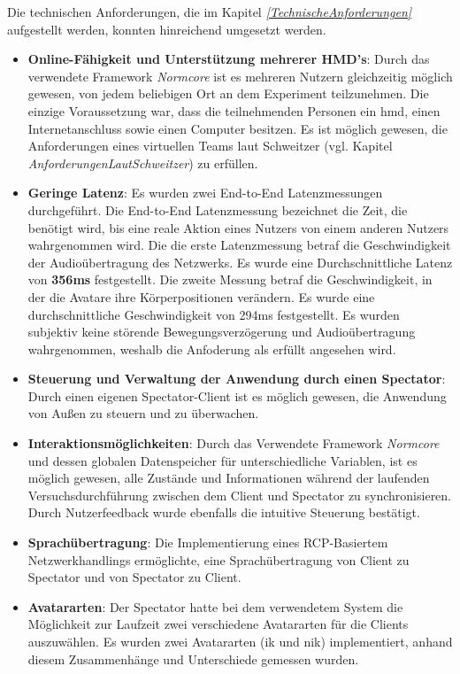 \documentclass[a4paper,11pt]{article}%
\renewcommand{\\}{\vspace*{0.5\baselineskip} \newline}
\begin{document}
Die technischen Anforderungen, die im Kapitel \textit{\ref{TechnischeAnforderungen}} aufgestellt werden, konnten hinreichend umgesetzt werden.
\begin{itemize}
\item \textbf{Online-Fähigkeit und Unterstützung mehrerer HMD's}: Durch das verwendete Framework \textit{Normcore} ist es mehreren Nutzern gleichzeitig möglich gewesen, von jedem beliebigen Ort an dem Experiment teilzunehmen. Die einzige Voraussetzung war, dass die teilnehmenden Personen ein \ac{hmd}, einen Internetanschluss sowie einen Computer besitzen. Es ist möglich gewesen, die Anforderungen eines virtuellen Teams laut Schweitzer \citep[p.270]{schweitzer2010conceptualizing} (vgl. Kapitel \textit{AnforderungenLautSchweitzer}) zu erfüllen. 
\item \textbf{Geringe Latenz}: Es wurden zwei End-to-End Latenzmessungen durchgeführt. Die End-to-End Latenzmessung bezeichnet die Zeit, die benötigt wird, bis eine reale Aktion eines Nutzers von einem anderen Nutzers wahrgenommen wird. Die die erste Latenzmessung betraf die Geschwindigkeit der Audioübertragung des Netzwerks. Es wurde eine Durchschnittliche Latenz von \textbf{356ms} festgestellt.
Die zweite Messung betraf die Geschwindigkeit, in der die Avatare ihre Körperpositionen verändern. Es wurde eine durchschnittliche Geschwindigkeit von 294ms festgestellt.
Es wurden subjektiv keine störende Bewegungsverzögerung und Audioübertragung wahrgenommen, weshalb die Anfoderung als erfüllt angesehen wird.
\item \textbf{Steuerung und Verwaltung der Anwendung durch einen Spectator}: Durch einen eigenen Spectator-Client ist es möglich gewesen, die Anwendung von Außen zu steuern und zu überwachen.
\item \textbf{Interaktionsmöglichkeiten}:  Durch das Verwendete Framework \textit{Normcore} und dessen globalen Datenspeicher für unterschiedliche Variablen, ist es möglich gewesen, alle Zustände und Informationen während der laufenden Versuchsdurchführung zwischen dem Client und Spectator zu synchronisieren. Durch Nutzerfeedback wurde ebenfalls die intuitive Steuerung bestätigt.
\item \textbf{Sprachübertragung}: Die Implementierung eines RCP-Basiertem Netzwerkhandlings ermöglichte, eine Sprachübertragung von Client zu Spectator und von Spectator zu Client.
\item \textbf{Avatararten}: Der Spectator hatte bei dem verwendetem System die Möglichkeit zur Laufzeit zwei verschiedene Avatararten für die Clients auszuwählen. Es wurden zwei Avatararten (\ac{ik} und \ac{nik}) implementiert, anhand diesem Zusammenhänge und Unterschiede gemessen wurden.
\end{itemize}
\end{document}
